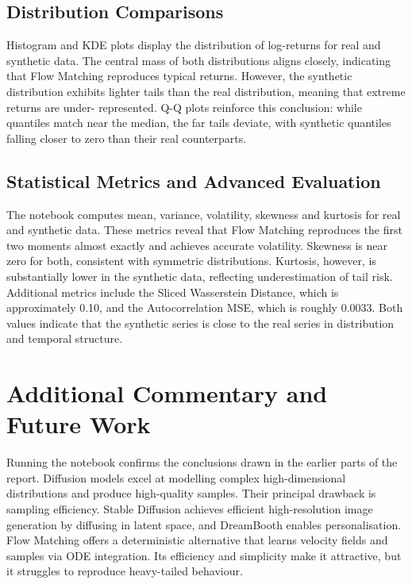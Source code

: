 \subsection{Distribution Comparisons}

Histogram and KDE plots display the distribution of log-returns for
real and synthetic data.  The central mass of both distributions
aligns closely, indicating that Flow Matching reproduces typical
returns.  However, the synthetic distribution exhibits lighter tails
than the real distribution, meaning that extreme returns are under-
represented.  Q-Q plots reinforce this conclusion: while quantiles
match near the median, the far tails deviate, with synthetic
quantiles falling closer to zero than their real counterparts.

\subsection{Statistical Metrics and Advanced Evaluation}

The notebook computes mean, variance, volatility, skewness and
kurtosis for real and synthetic data.  These metrics reveal that
Flow Matching reproduces the first two moments almost exactly and
achieves accurate volatility.  Skewness is near zero for both,
consistent with symmetric distributions.  Kurtosis, however, is
substantially lower in the synthetic data, reflecting underestimation
of tail risk.  Additional metrics include the Sliced Wasserstein
Distance, which is approximately 0.10, and the Autocorrelation MSE,
which is roughly 0.0033.  Both values indicate that the synthetic
series is close to the real series in distribution and temporal
structure.

\section{Additional Commentary and Future Work}

Running the notebook confirms the conclusions drawn in the earlier
parts of the report.  Diffusion models excel at modelling complex
high-dimensional distributions and produce high-quality samples.
Their principal drawback is sampling efficiency.  Stable Diffusion
achieves efficient high-resolution image generation by diffusing in
latent space, and DreamBooth enables personalisation.  Flow Matching
offers a deterministic alternative that learns velocity fields and
samples via ODE integration.  Its efficiency and simplicity make it
attractive, but it struggles to reproduce heavy-tailed behaviour.


